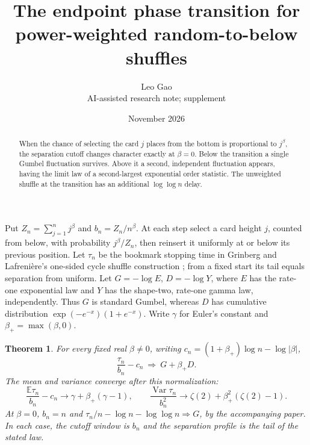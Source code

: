 \documentclass[11pt]{article}
\title{The endpoint phase transition for power-weighted random-to-below shuffles}
\author{Leo Gao\\\small AI-assisted research note; supplement}
\date{November 2026}
\newtheorem{theorem}{Theorem}
\begin{document}
\maketitle
\begin{abstract}
When the chance of selecting the card $j$ places from the bottom is proportional to $j^\beta$, the separation cutoff changes character exactly at $\beta=0$. Below the transition a single Gumbel fluctuation survives. Above it a second, independent fluctuation appears, having the limit law of a second-largest exponential order statistic. The unweighted shuffle at the transition has an additional $\log\log n$ delay.
\end{abstract}
Put $Z_n=\sum_{j=1}^n j^\beta$ and $b_n=Z_n/n^\beta$. At each step select a card height $j$, counted from below, with probability $j^\beta/Z_n$, then reinsert it uniformly at or below its previous position. Let $\tau_n$ be the bookmark stopping time in Grinberg and Lafrenière's one-sided cycle shuffle construction \cite[\S15]{GL}; from a fixed start its tail equals separation from uniform. Let $G=-\log E$, $D=-\log Y$, where $E$ has the rate-one exponential law and $Y$ has the shape-two, rate-one gamma law, independently. Thus $G$ is standard Gumbel, whereas $D$ has cumulative distribution $\exp(-e^{-x})(1+e^{-x})$. Write $\gamma$ for Euler's constant and $\beta_+=\max(\beta,0)$.
\begin{theorem}
For every fixed real $\beta\ne0$, writing $c_n=(1+\beta_+)\log n-\log|\beta|$,
\[
 \frac{\tau_n}{b_n}-c_n\ \Rightarrow\ G+\beta_+D.
\]
The mean and variance converge after this normalization:
\[
 \frac{\mathbb E\tau_n}{b_n}-c_n\longrightarrow\gamma+\beta_+(\gamma-1),\qquad
 \frac{\operatorname{Var}\tau_n}{b_n^2}\longrightarrow
 \zeta(2)+\beta_+^2(\zeta(2)-1).
\]
At $\beta=0$, $b_n=n$ and $\tau_n/n-\log n-\log\log n\Rightarrow G$, by the accompanying paper. In each case, the cutoff window is $b_n$ and the separation profile is the tail of the stated law.
\end{theorem}
\end{document}
